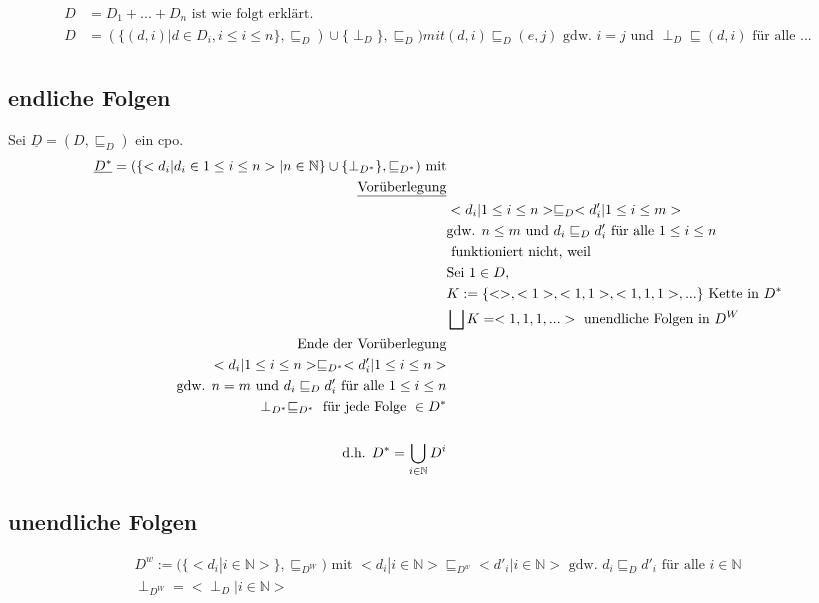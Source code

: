 \begin{align*}
D &= D_1 + ... + D_n \text{ ist wie folgt erklärt.}\\
D &= (\{(d,i) | d \in D_i, i \leq i \leq n\}, \sqsubseteq_D ) \cup \{\perp_D\}, \sqsubseteq_D) mit (d,i) \sqsubseteq_D (e,j) \text{ gdw. } i = j \text{ und } \perp_D \sqsubseteq (d,i) \text{ für alle ...}\\
\end{align*}
\subsection{endliche Folgen}
Sei $\underline{D}=(D,\sqsubseteq_D)$ ein cpo.
\begin{align*}
\underline{D^*} = (\{ <d_i | d_i \in 1 \leq i \leq n > | n \in \mathbb{N} \} \cup \{ \perp_{D^*}\}, \sqsubseteq_{D^*})\text{ mit}&\\
\text{\underline{Vorüberlegung}}& \\
& <d_i | 1 \leq i \leq n> \sqsubseteq_D <d'_i | 1 \leq i \leq m> \\
&\text{gdw. } n \leq m \text{ und } d_i \sqsubseteq_D d'_i \text{ für alle } 1 \leq i \leq n \\
& \text{ funktioniert nicht, weil}\\
&\text{Sei } 1 \in D,\\
& K:= \{ <>,<1>,<1,1>,<1,1,1>,... \} \text{ Kette in } D^* \\
&\bigsqcup K = <1,1,1,...> \text{ unendliche Folgen in } D^W\\
\text{Ende der Vorüberlegung}&\\
<d_i | 1 \leq i \leq n > \sqsubseteq_{D^*} <d'_i | 1 \leq i \leq n > &\\
\text{gdw. } n = m \text{ und } d_i \sqsubseteq_D d'_i \text{ für alle } 1 \leq i \leq n & \\
\perp_{D^*} \sqsubseteq_{D^*} \text{ für jede Folge } \in D^* &\\
\\
\text{d.h. } D^* = \bigcup_{i \in \mathbb{N}} D^i &\\
\end{align*}
\subsection{unendliche Folgen}
\begin{align*}
D^w := (\{ < d_i | i \in \mathbb{N} > \}, \sqsubseteq_{D^W}) \text{ mit } <d_i | i \in \mathbb{N} > \sqsubseteq_{D^w} <d'_i | i \in \mathbb{N}> \text{ gdw. } d_i \sqsubseteq_{D} d'_i \text{ für alle } i \in \mathbb{N}\\
\perp_{D^W} = <\perp_D | i \in \mathbb{N}>\\
\end{align*}
